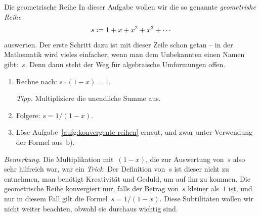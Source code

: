 \documentclass[twoside]{../zirkelblatt1415}
\theoremstyle{definition}
\theoremstyle{plain}
\theoremstyle{remark}
\newcommand{\defeq}{\vcentcolon=}
\begin{document}
\begin{aufgabe}{Die geometrische Reihe}\label{aufg:geometrische-reihe}
In dieser Aufgabe wollen wir die so genannte \emph{geometrishe Reihe}
\[ s \defeq 1 + x + x^2 + x^3 + \cdots \]
auswerten. Der erste Schritt dazu ist mit dieser Zeile schon getan -- in der
Mathematik wird vieles einfacher, wenn man dem Unbekannten einen Namen
gibt:~$s$. Denn dann steht der Weg für algebraische Umformungen offen.
\begin{enumerate}
\item Rechne nach: $s \cdot (1 - x) = 1$.

\emph{Tipp.} Multipliziere die unendliche Summe aus.

\item Folgere: $s = 1/(1-x)$.

\item Löse Aufgabe~\ref{aufg:konvergente-reihen} erneut, und zwar unter
Verwendung der Formel aus~b).
\end{enumerate}

\emph{Bemerkung.} Die Multiplikation mit~$(1-x)$, die zur Auswertung von~$s$
also sehr hilfreich war, war ein \emph{Trick}. Der Definition von~$s$ ist
dieser nicht zu entnehmen, man benötigt Kreativität und Geduld, um auf ihn zu
kommen. Die geometrische Reihe konvergiert nur, falls der Betrag von~$s$
kleiner als~$1$ ist, und nur in diesem Fall gilt die Formel~$s = 1/(1-x)$.
Diese Subtilitäten wollen wir nicht weiter beachten, obwohl sie durchaus
wichtig sind.
\end{aufgabe}
\end{document}
